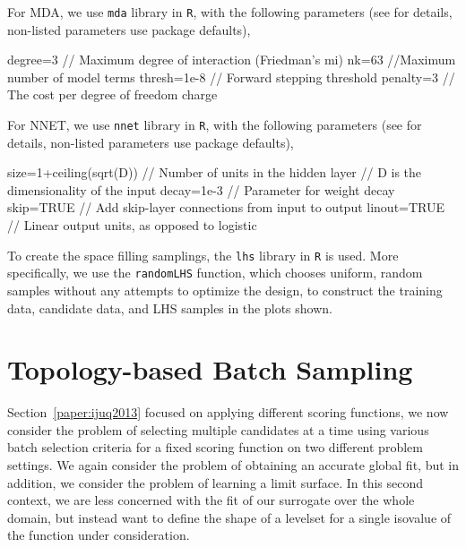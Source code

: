 For MDA, we use \texttt{mda} library in \texttt{R}, with the following parameters (see \cite{mda} for details, non-listed parameters use package defaults),
\begin{code}
degree=3 // Maximum degree of interaction (Friedman's mi)
nk=63  //Maximum number of model terms
thresh=1e-8 // Forward stepping threshold
penalty=3 // The cost per degree of freedom charge
\end{code}

For NNET, we use \texttt{nnet} library in \texttt{R}, with the following parameters (see \cite{nnet} for details, non-listed parameters use package defaults),
\begin{code}
size=1+ceiling(sqrt(D)) // Number of units in the hidden layer
                        // D is the dimensionality of the input
decay=1e-3 // Parameter for weight decay
skip=TRUE // Add skip-layer connections from input to output
linout=TRUE // Linear output units, as opposed to logistic
\end{code}

To create the space filling samplings, the \texttt{lhs} library in \texttt{R} \cite{lhs} is used.
%
More specifically, we use the \texttt{randomLHS} function, which chooses uniform, random samples without any attempts to optimize the design, to construct the training data, candidate data, and LHS samples in the plots shown.


\section{Topology-based Batch Sampling}
\label{paper:batch}

Section~\ref{paper:ijuq2013} focused on applying different scoring functions, we now consider the problem of selecting multiple candidates at a time using various batch selection criteria for a fixed scoring function on two different problem settings.
%
We again consider the problem of obtaining an accurate global fit, but in addition, we consider the problem of learning a limit surface.
%
In this second context, we are less concerned with the fit of our surrogate over the whole domain, but instead want to define the shape of a levelset for a single isovalue of the function under consideration.


